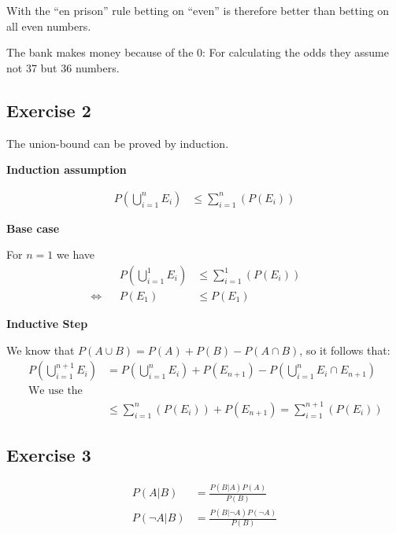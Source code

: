 With the ``en prison'' rule betting on ``even'' is therefore better than betting on all even numbers.

\emptyline

The bank makes money because of the $0$: For calculating the odds they assume not 37 but 36 numbers.


\subsection*{Exercise 2}
\setcounter{equation}{0}
The union-bound can be proved by induction.

\emptyline

\begin{samepage}
\textbf{Induction assumption}

\begin{align}
& & P\left(\bigcup\limits_{i=1}^{n}E_i\right) & \leq \sum\limits_{i=1}^{n}(P(E_i)) & &
\end{align}
\end{samepage}

\begin{samepage}
\textbf{Base case}

For $n=1$ we have
\begin{align}
& & P\left(\bigcup\limits_{i=1}^{1}E_i\right) & \leq \sum\limits_{i=1}^{1}(P(E_i)) & & \\
\Leftrightarrow & & P(E_1) & \leq P(E_1) & & 
\end{align}
\end{samepage}

\begin{samepage}
\textbf{Inductive Step}

We know that $P(A \cup B) = P(A) + P(B) - P(A \cap B)$, so it follows that:
\begin{align}
& & P\left(\bigcup\limits_{i=1}^{n+1}E_i\right) & = P\left(\bigcup\limits_{i=1}^{n}E_i\right) + P(E_{n+1}) - P\left(\bigcup\limits_{i=1}^{n}E_i \cap E_{n+1}\right) & & \\
& & \mbox{We use the induction assumption:} & & & \\
& & & \leq \sum\limits_{i=1}^{n}(P(E_i)) + P(E_{n+1}) = \sum\limits_{i=1}^{n+1}(P(E_i)) & & 
\end{align}
\end{samepage}

\subsection*{Exercise 3}
\begin{align*}
P(A|B) & = \frac{P(B|A)P(A)}{P(B)} \\
P(\neg A|B) & = \frac{P(B|\neg A)P(\neg A)}{P(B)}
\end{align*}

